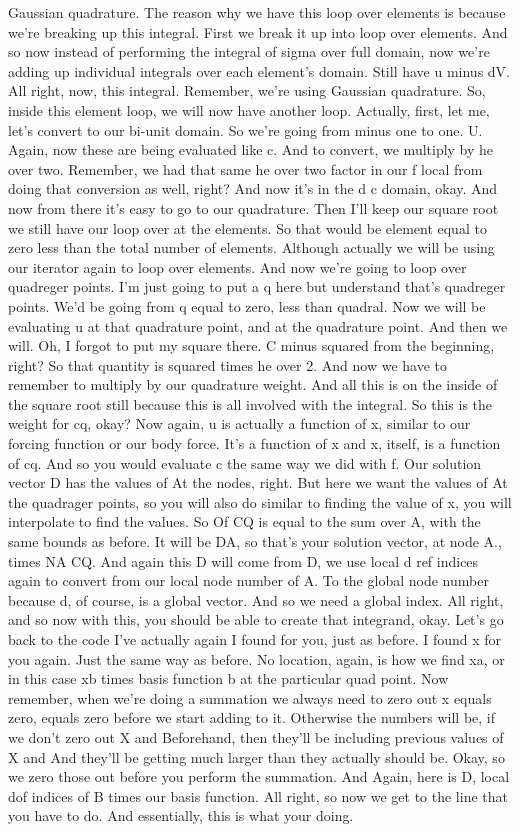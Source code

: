 \documentclass[10pt]{article}
\begin{document}
{Gaussian quadrature. The reason why we have this loop over elements is because we're breaking up this integral. First we break it up into loop over elements. And so now instead of performing the integral of sigma over full domain, now we're adding up individual integrals over each element's domain. Still have u minus dV. All right, now, this integral. Remember, we're using Gaussian quadrature. So, inside this element loop, we will now have another loop. Actually, first, let me, let's convert to our bi-unit domain. So we're going from minus one to one. U. Again, now these are being evaluated like c. And to convert, we multiply by he over two. Remember, we had that same he over two factor in our f local from doing that conversion as well, right? And now it's in the d c domain, okay. And now from there it's easy to go to our quadrature. Then I'll keep our square root we still have our loop over at the elements. So that would be element equal to zero less than the total number of elements. Although actually we will be using our iterator again to loop over elements. And now we're going to loop over quadreger points. I'm just going to put a q here but understand that's quadreger points. We'd be going from q equal to zero, less than quadral. Now we will be evaluating u at that quadrature point, and at the quadrature point. And then we will. Oh, I forgot to put my square there. C minus squared from the beginning, right? So that quantity is squared times he over 2. And now we have to remember to multiply by our quadrature weight. And all this is on the inside of the square root still because this is all involved with the integral. So this is the weight for cq, okay? Now again, u is actually a function of x, similar to our forcing function or our body force. It's a function of x and x, itself, is a function of cq. And so you would evaluate c the same way we did with f. Our solution vector D has the values of At the nodes, right. But here we want the values of At the quadrager points, so you will also do similar to finding the value of x, you will interpolate to find the values. So Of CQ is equal to the sum over A, with the same bounds as before. It will be DA, so that's your solution vector, at node A., times NA CQ. And again this D will come from D, we use local d ref indices again to convert from our local node number of A. To the global node number because d, of course, is a global vector. And so we need a global index. All right, and so now with this, you should be able to create that integrand, okay. Let's go back to the code I've actually again I found for you, just as before. I found x for you again. Just the same way as before. No location, again, is how we find xa, or in this case xb times basis function b at the particular quad point. Now remember, when we're doing a summation we always need to zero out x equals zero, equals zero before we start adding to it. Otherwise the numbers will be, if we don't zero out X and Beforehand, then they'll be including previous values of X and And they'll be getting much larger than they actually should be. Okay, so we zero those out before you perform the summation. And Again, here is D, local dof indices of B times our basis function. All right, so now we get to the line that you have to do. And essentially, this is what your doing. }
\end{document}
